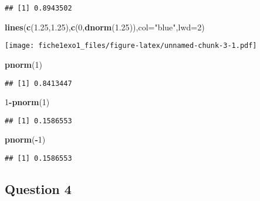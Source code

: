 \documentclass[]{article}
\newenvironment{Shaded}{\begin{snugshade}}{\end{snugshade}}
\newcommand{\DataTypeTok}[1]{\textcolor[rgb]{0.13,0.29,0.53}{#1}}
\newcommand{\DecValTok}[1]{\textcolor[rgb]{0.00,0.00,0.81}{#1}}
\newcommand{\FloatTok}[1]{\textcolor[rgb]{0.00,0.00,0.81}{#1}}
\newcommand{\KeywordTok}[1]{\textcolor[rgb]{0.13,0.29,0.53}{\textbf{#1}}}
\newcommand{\NormalTok}[1]{#1}
\newcommand{\OperatorTok}[1]{\textcolor[rgb]{0.81,0.36,0.00}{\textbf{#1}}}
\newcommand{\StringTok}[1]{\textcolor[rgb]{0.31,0.60,0.02}{#1}}
\begin{document}
\begin{verbatim}
## [1] 0.8943502
\end{verbatim}

\begin{Shaded}
\begin{Highlighting}[]
\KeywordTok{lines}\NormalTok{(}\KeywordTok{c}\NormalTok{(}\FloatTok{1.25}\NormalTok{,}\FloatTok{1.25}\NormalTok{),}\KeywordTok{c}\NormalTok{(}\DecValTok{0}\NormalTok{,}\KeywordTok{dnorm}\NormalTok{(}\FloatTok{1.25}\NormalTok{)),}\DataTypeTok{col=}\StringTok{"blue"}\NormalTok{,}\DataTypeTok{lwd=}\DecValTok{2}\NormalTok{)}
\end{Highlighting}
\end{Shaded}

\texttt{[image: fiche1exo1\_files/figure-latex/unnamed-chunk-3-1.pdf]}

\begin{Shaded}
\begin{Highlighting}[]
\KeywordTok{pnorm}\NormalTok{(}\DecValTok{1}\NormalTok{)}
\end{Highlighting}
\end{Shaded}

\begin{verbatim}
## [1] 0.8413447
\end{verbatim}

\begin{Shaded}
\begin{Highlighting}[]
\DecValTok{1}\OperatorTok{-}\KeywordTok{pnorm}\NormalTok{(}\DecValTok{1}\NormalTok{)}
\end{Highlighting}
\end{Shaded}

\begin{verbatim}
## [1] 0.1586553
\end{verbatim}

\begin{Shaded}
\begin{Highlighting}[]
\KeywordTok{pnorm}\NormalTok{(}\OperatorTok{-}\DecValTok{1}\NormalTok{)}
\end{Highlighting}
\end{Shaded}

\begin{verbatim}
## [1] 0.1586553
\end{verbatim}

\hypertarget{question-4}{%
\subsection{Question 4}\label{question-4}}
\end{document}
